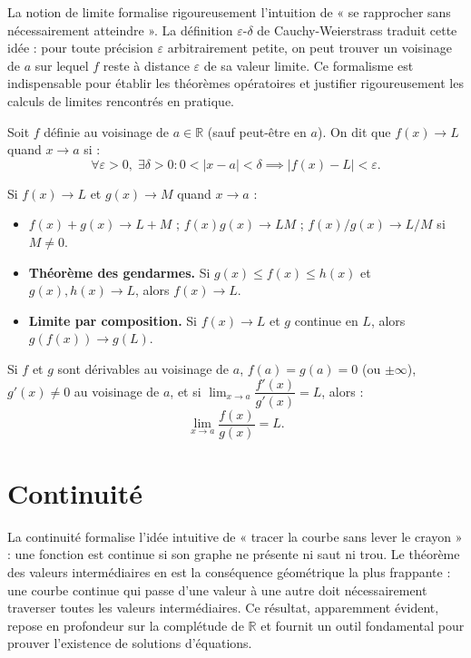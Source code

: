 \documentclass[11pt,a4paper,twoside]{book}
\newcommand{\R}{\mathbb{R}}
\begin{document}
La notion de limite formalise rigoureusement l'intuition de « se rapprocher sans nécessairement atteindre ». La définition $\varepsilon$-$\delta$ de Cauchy-Weierstrass traduit cette idée : pour toute précision $\varepsilon$ arbitrairement petite, on peut trouver un voisinage de $a$ sur lequel $f$ reste à distance $\varepsilon$ de sa valeur limite. Ce formalisme est indispensable pour établir les théorèmes opératoires et justifier rigoureusement les calculs de limites rencontrés en pratique.

\begin{definitionbox}
Soit $f$ définie au voisinage de $a \in \R$ (sauf peut-être en $a$).
On dit que $f(x) \to L$ quand $x \to a$ si :
\[
  \forall \varepsilon > 0,\;\exists \delta > 0 : 0 < |x-a| < \delta \implies |f(x)-L| < \varepsilon.
\]
\end{definitionbox}

\begin{theoremebox}
Si $f(x) \to L$ et $g(x) \to M$ quand $x \to a$ :
\begin{itemize}
  \item $f(x)+g(x) \to L+M$ ; $f(x)g(x) \to LM$ ; $f(x)/g(x) \to L/M$ si $M \neq 0$.
  \item \textbf{Théorème des gendarmes.} Si $g(x) \leq f(x) \leq h(x)$ et $g(x),h(x) \to L$, alors $f(x) \to L$.
  \item \textbf{Limite par composition.} Si $f(x) \to L$ et $g$ continue en $L$, alors $g(f(x)) \to g(L)$.
\end{itemize}
\end{theoremebox}

\begin{theoremebox}
Si $f$ et $g$ sont dérivables au voisinage de $a$, $f(a)=g(a)=0$ (ou $\pm\infty$), $g'(x)\neq 0$ au voisinage de $a$, et si $\lim_{x\to a}\dfrac{f'(x)}{g'(x)} = L$, alors :
\[
  \lim_{x\to a}\frac{f(x)}{g(x)} = L.
\]
\end{theoremebox}

\section{Continuité}

La continuité formalise l'idée intuitive de « tracer la courbe sans lever le crayon » : une fonction est continue si son graphe ne présente ni saut ni trou. Le théorème des valeurs intermédiaires en est la conséquence géométrique la plus frappante : une courbe continue qui passe d'une valeur à une autre doit nécessairement traverser toutes les valeurs intermédiaires. Ce résultat, apparemment évident, repose en profondeur sur la complétude de $\mathbb{R}$ et fournit un outil fondamental pour prouver l'existence de solutions d'équations.
\end{document}
